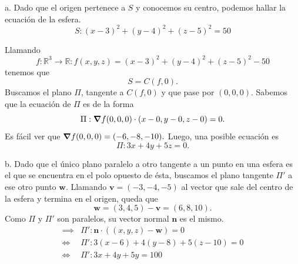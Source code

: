 
\begin{solution}
    a. Dado que el origen pertenece a $S$ y conocemos su centro, podemos hallar la ecuación de la esfera.
    \[
        S:(x-3)^2 + (y-4)^2 + (z-5)^2 = 50
    \]
    \begin{center}
    \end{center}

    Llamando $$f:\mathbb{R}^3 \rightarrow \mathbb{R}:  f(x,y,z) = (x-3)^2 + (y-4)^2 + (z-5)^2 - 50$$
    tenemos que $$S=C(f,0). $$
    Buscamos el plano $\Pi$, tangente a $C(f,0)$ y que pase por $(0,0,0)$. Sabemos que la ecuación de  $\Pi$  es  de la forma
    \[
        \Pi:\grad f(0,0,0) \cdot (x-0,y-0,z-0) = 0.
    \]
    Es f\'acil ver que $\grad f(0,0,0) = (-6,-8,-10).$  Luego, una posible ecuaci\'on es
    \[
    \Pi: 3x + 4y + 5z = 0.
\]

    b. Dado que el único plano paralelo a otro tangente a un punto en una esfera es el que se encuentra en el polo opuesto de ésta, buscamos el plano tangente $\Pi'$ a ese otro punto $\mathbf{w}$. Llamando $\mathbf{v} = (-3,-4,-5)$ al vector que sale del centro de la esfera y termina en el origen, queda que
    \[
        \mathbf{w} = (3,4,5) - \mathbf{v} = (6,8,10).
    \]
    Como $\Pi$ y $\Pi'$ son paralelos, su vector normal $\textbf{n}$ es el mismo.
    \[
        \begin{aligned}
            \implies & \Pi ': \textbf{n} \cdot ((x,y,z) - \mathbf{w}) = 0 \\
            \iff     & \Pi ': 3(x-6) + 4(y-8) + 5(z-10) = 0               \\
            \iff     & \Pi ':3x + 4y + 5y = 100
        \end{aligned}
    \]


\end{solution}
